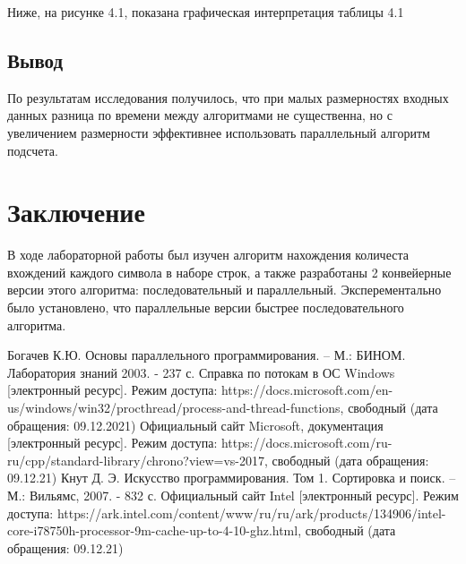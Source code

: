 \documentclass[12pt]{report}
\begin{document}
Ниже,  на рисунке  4.1,  показана  графическая  интерпретация  таблицы  4.1

\begin{figure}[h!]
	\label{figure:image}
\end{figure}
 
 \section*{Вывод}
 \qquad По результатам исследования получилось, что при малых размерностях входных данных разница по времени между алгоритмами не существенна, но с увеличением размерности эффективнее использовать параллельный алгоритм подсчета.
 
\newpage
\chapter*{Заключение}
\hspace{0.6cm}В ходе лабораторной работы был изучен алгоритм нахождения количеста вхождений каждого символа в наборе строк, а также разработаны 2 конвейерные версии этого алгоритма: последовательный и параллельный. Эксперементально было установлено, что параллельные версии быстрее последовательного алгоритма.


\begin{thebibliography}{2}
	 Богачев К.Ю. Основы параллельного программирования. – М.: БИНОМ. Лаборатория знаний 2003. - 237 с.
	 Справка по потокам в ОС Windows [электронный ресурс]. Режим доступа: https://docs.microsoft.com/en-us/windows/win32/procthread/process-and-thread-functions, свободный (дата обращения: 09.12.2021)
	 Официальный сайт Microsoft, документация [электронный ресурс]. Режим доступа: https://docs.microsoft.com/ru-ru/cpp/standard-library/chrono?view=vs-2017, свободный (дата обращения: 09.12.21)
	 Кнут Д. Э. Искусство программирования. Том 1. Сортировка и поиск. – М.: Вильямс, 2007. - 832 с.
	 Официальный сайт Intel [электронный ресурс]. Режим доступа: https://ark.intel.com/content/www/ru/ru/ark/products/134906/intel-core-i78750h-processor-9m-cache-up-to-4-10-ghz.html, свободный (дата обращения: 09.12.21)
	
\end{thebibliography}
\end{document}
